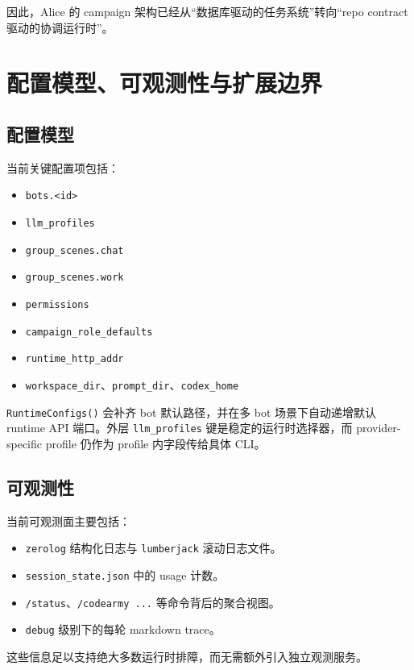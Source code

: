 \documentclass[12pt,a4paper]{ctexart}
\begin{document}
因此，Alice 的 campaign 架构已经从“数据库驱动的任务系统”转向“repo contract 驱动的协调运行时”。

\section{配置模型、可观测性与扩展边界}

\subsection{配置模型}

当前关键配置项包括：

\begin{itemize}
  \item \texttt{bots.<id>}
  \item \texttt{llm\_profiles}
  \item \texttt{group\_scenes.chat}
  \item \texttt{group\_scenes.work}
  \item \texttt{permissions}
  \item \texttt{campaign\_role\_defaults}
  \item \texttt{runtime\_http\_addr}
  \item \texttt{workspace\_dir}、\texttt{prompt\_dir}、\texttt{codex\_home}
\end{itemize}

\texttt{RuntimeConfigs()} 会补齐 bot 默认路径，并在多 bot 场景下自动递增默认 runtime API 端口。外层 \texttt{llm\_profiles} 键是稳定的运行时选择器，而 provider-specific profile 仍作为 profile 内字段传给具体 CLI。

\subsection{可观测性}

当前可观测面主要包括：

\begin{itemize}
  \item \texttt{zerolog} 结构化日志与 \texttt{lumberjack} 滚动日志文件。
  \item \texttt{session\_state.json} 中的 usage 计数。
  \item \texttt{/status}、\texttt{/codearmy ...} 等命令背后的聚合视图。
  \item \texttt{debug} 级别下的每轮 markdown trace。
\end{itemize}

这些信息足以支持绝大多数运行时排障，而无需额外引入独立观测服务。
\end{document}
